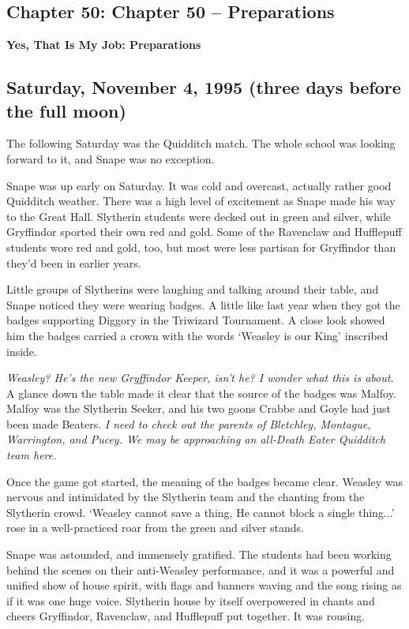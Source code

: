 \documentclass[a4paper,11pt]{article}
\begin{document}
\subsection{Chapter 50: Chapter 50 – Preparations}

\textbf{Yes, That Is My Job: Preparations}

\subsection{Saturday, November 4, 1995 (three days before the full moon)}

The following Saturday was the Quidditch match. The whole school was looking forward to it, and Snape was no exception.

Snape was up early on Saturday. It was cold and overcast, actually rather good Quidditch weather. There was a high level of excitement as Snape made his way to the Great Hall. Slytherin students were decked out in green and silver, while Gryffindor sported their own red and gold. Some of the Ravenclaw and Hufflepuff students wore red and gold, too, but most were less partisan for Gryffindor than they'd been in earlier years.

Little groups of Slytherins were laughing and talking around their table, and Snape noticed they were wearing badges. A little like last year when they got the badges supporting Diggory in the Triwizard Tournament. A close look showed him the badges carried a crown with the words `Weasley is our King' inscribed inside.

\emph{Weasley? He's the new Gryffindor Keeper, isn't he? I wonder what this is about.} A glance down the table made it clear that the source of the badges was Malfoy. Malfoy was the Slytherin Seeker, and his two goons Crabbe and Goyle had just been made Beaters. \emph{I need to check out the parents of Bletchley, Montague, Warrington, and Pucey. We may be approaching an all-Death Eater Quidditch team here.}

Once the game got started, the meaning of the badges became clear. Weasley was nervous and intimidated by the Slytherin team and the chanting from the Slytherin crowd. `Weasley cannot save a thing, He cannot block a single thing...' rose in a well-practiced roar from the green and silver stands.

Snape was astounded, and immensely gratified. The students had been working behind the scenes on their anti-Weasley performance, and it was a powerful and unified show of house spirit, with flags and banners waving and the song rising as if it was one huge voice. Slytherin house by itself overpowered in chants and cheers Gryffindor, Ravenclaw, and Hufflepuff put together. It was rousing.
\end{document}
